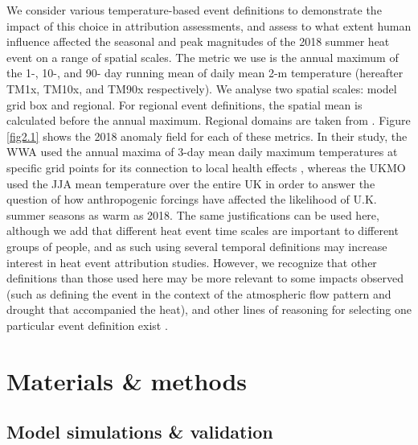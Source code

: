   We consider various temperature-based event definitions to demonstrate the impact of this choice in attribution assessments, and assess to what extent human influence affected the seasonal and peak magnitudes of the 2018 summer heat event on a range of spatial scales. The metric we use is the annual maximum of the 1-, 10-, and 90- day running mean of daily mean 2-m temperature (hereafter TM1x, TM10x, and TM90x respectively). We analyse two spatial scales: model grid box and regional. For regional event definitions, the spatial mean is calculated before the annual maximum. Regional domains are taken from \citet{christensen_summary_2007}. Figure \ref{fig2.1} shows the 2018 anomaly field for each of these metrics. In their study, the WWA used the annual maxima of 3-day mean daily maximum temperatures at specific grid points for its connection to local health effects \citep{dippoliti_impact_2010}, whereas the UKMO used the JJA mean temperature over the entire UK in order to answer the question of how anthropogenic forcings have affected the likelihood of U.K. summer seasons as warm as 2018. The same justifications can be used here, although we add that different heat event time scales are important to different groups of people, and as such using several temporal definitions may increase interest in heat event attribution studies. However, we recognize that other definitions than those used here may be more relevant to some impacts observed (such as defining the event in the context of the atmospheric flow pattern and drought that accompanied the heat), and other lines of reasoning for selecting one particular event definition exist \citep{cattiaux_defining_2018}.

\section{Materials \& methods}\label{ch2:methods}

  \subsection*{Model simulations \& validation}

